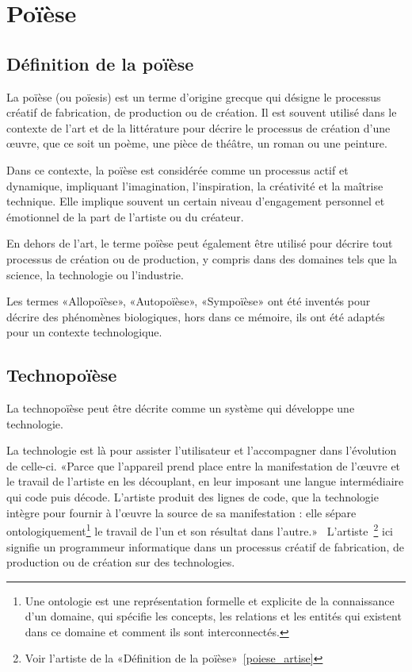 \section{Poïèse}

\subsection{Définition de la poïèse}

La poïèse (ou poïesis) est un terme d'origine grecque qui désigne le processus créatif de fabrication, de production ou de création. Il est souvent utilisé dans le contexte de l'art et de la littérature pour décrire le processus de création d'une œuvre, que ce soit un poème, une pièce de théâtre, un roman ou une peinture.

Dans ce contexte, la poïèse est considérée comme un processus actif et dynamique, impliquant l'imagination, l'inspiration, la créativité et la maîtrise technique. Elle implique souvent un certain niveau d'engagement personnel et émotionnel de la part de l'artiste\label{poiese_artise} ou du créateur.

En dehors de l'art, le terme poïèse peut également être utilisé pour décrire tout processus de création ou de production, y compris dans des domaines tels que la science, la technologie ou l'industrie.

Les termes «Allopoïèse», «Autopoïèse», «Sympoïèse» ont été inventés pour décrire des phénomènes biologiques, hors dans ce mémoire, ils ont été adaptés pour un contexte technologique.

\subsection{Technopoïèse}



La technopoïèse peut être décrite comme un système qui développe une technologie.

La technologie est là pour assister l'utilisateur et l'accompagner dans l'évolution de celle-ci. «Parce que l’appareil prend place entre la manifestation de l’œuvre et le travail de l’artiste en les découplant, en leur imposant une langue intermédiaire qui code puis décode. L’artiste produit des lignes de code, que la technologie intègre pour fournir à l’œuvre la source de sa manifestation : elle sépare ontologiquement\footnote{Une ontologie est une représentation formelle et explicite de la connaissance d'un domaine, qui spécifie les concepts, les relations et les entités qui existent dans ce domaine et comment ils sont interconnectés.} le travail de l’un et son résultat dans l’autre.»~\cite{artiste_techno_conf_2012} L'artiste~\footnote{Voir l'artiste de la «Définition de la poïèse»~\ref{poiese_artise}} ici signifie un programmeur informatique dans un processus créatif de fabrication, de production ou de création sur des technologies.

